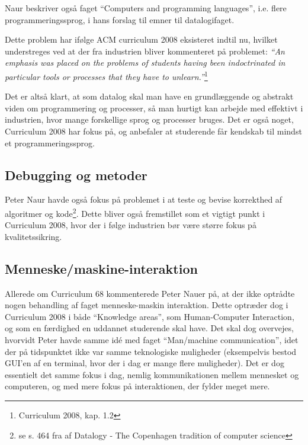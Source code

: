 \documentclass[10pt,a4paper]{article}
\newcommand{\citat}[2]{\vspace{0.2cm}\newline\textit{``#1''}\hspace{0.1cm}\footnote{#2}\vspace{0.2cm}\newline}
\begin{document}
Naur beskriver også faget ``Computers and programming languages'', i.e. flere programmeringssprog, i hans forslag til emner til datalogifaget. 

Dette problem har ifølge ACM curriculum 2008 eksisteret indtil nu, hvilket understreges ved at der fra industrien bliver kommenteret på problemet: 
\citat{An emphasis was placed on the problems of students having been indoctrinated in particular tools or processes that they have to unlearn.}{Curriculum 2008, kap. 1.2}

Det er altså klart, at som datalog skal man have en grundlæggende og abstrakt viden om programmering og processer, så man hurtigt kan arbejde med effektivt i industrien, hvor mange forskellige sprog og processer bruges. Det er også noget, Curriculum 2008 har fokus på, og anbefaler at studerende får kendskab til mindst et programmeringssprog.

\subsection{Debugging og metoder}
Peter Naur havde også fokus på problemet i at teste og bevise korrekthed af algoritmer og kode\footnote{se s. 464 fra af Datalogy - The Copenhagen tradition of computer science}. Dette bliver også fremstillet som et vigtigt punkt i Curriculum 2008, hvor der i følge industrien bør være større fokus på kvalitetssikring. 

\subsection{Menneske/maskine-interaktion}
Allerede om Curriculum 68 kommenterede Peter Nauer på, at der ikke optrådte nogen behandling af faget menneske-maskin interaktion. Dette optræder dog i Curriculum 2008 i både ``Knowledge areas'', som Human-Computer Interaction, og som en færdighed en uddannet studerende skal have. Det skal dog overvejes, hvorvidt Peter havde samme idé med faget ``Man/machine communication'', idet der på tidspunktet ikke var samme teknologiske muligheder (eksempelvis bestod GUI'en af en terminal, hvor der i dag er mange flere muligheder). Det er dog essentielt det samme fokus i dag, nemlig kommunikationen mellem mennesket og computeren, og med mere fokus på interaktionen, der fylder meget mere.
\end{document}
